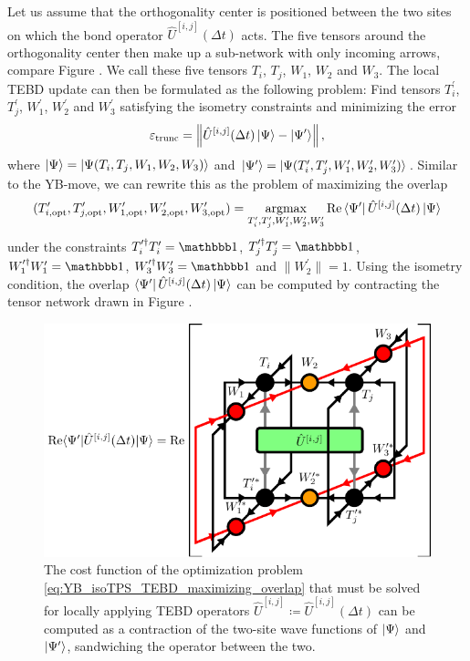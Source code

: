 Let us assume that the orthogonality center is positioned between the two sites on which the bond operator $\hat{U}^{[i, j]}\left(\Delta t\right)$ acts. The five tensors around the orthogonality center then make up a sub-network with only incoming arrows, compare Figure . We call these five tensors $T_i$, $T_j$, $W_1$, $W_2$ and $W_3$. The local TEBD update can then be formulated as the following problem: Find tensors $T_i^\prime$, $T_j^\prime$, $W_1^\prime$, $W_2^\prime$ and $W_3^\prime$ satisfying the isometry constraints and minimizing the error
\begin{equation}
	\label{eq:isoDTPS_TEBD_local_update_error}
	\varepsilon_\text{trunc} = \left\lVert \hat{U}^{[i, j]}(\Delta t)\ket{\Psi} - \ket{\Psi^\prime}\right\rVert,
\end{equation}
where $\ket{\Psi} = \ket{\Psi(T_i, T_j, W_1, W_2, W_3)}$ and $\ket{\Psi^\prime} = \ket{\Psi(T_i^\prime, T_j^\prime, W_1^\prime, W_2^\prime, W_3^\prime)}$. Similar to the YB-move, we can rewrite this as the problem of maximizing the overlap
\begin{equation}
	\label{eq:YB_isoTPS_TEBD_maximizing_overlap}
	(T_{i,\text{opt}}^\prime, T_{j,\text{opt}}^\prime, W_{1,\text{opt}}^\prime, W_{2,\text{opt}}^\prime, W_{3,\text{opt}}^\prime)= \underset{T_i^\prime, T_j^\prime, W_1^\prime, W_2^\prime, W_3^\prime}{\operatorname{argmax}}\operatorname{Re}\bra{\Psi^\prime}\hat{U}^{[i,j]}(\Delta t)\ket{\Psi}
\end{equation}
under the constraints $T_i^{\prime\dagger}T_i^\prime = \id$, $T_j^{\prime\dagger}T_j^\prime = \id$, $W_1^{\prime\dagger}W_1^\prime = \id$, $W_3^{\prime\dagger}W_3^\prime = \id$ and $\lVert W_2^\prime\rVert = 1$.
Using the isometry condition, the overlap $\bra{\Psi^\prime}\hat{U}^{[i, j]}(\Delta t)\ket{\Psi}$ can be computed by contracting the tensor network drawn in Figure . \par
\begin{figure}[ht]
	\centering
	\includegraphics[scale=1]{figures/tikz/YB_isoTPS/tebd_environment/tebd_environment.pdf}
	\caption{The cost function of the optimization problem \eqref{eq:YB_isoTPS_TEBD_maximizing_overlap} that must be solved for locally applying TEBD operators $\hat{U}^{[i,j]} \coloneqq \hat{U}^{[i,j]}(\Delta t)$ can be computed as a contraction of the two-site wave functions of $\ket{\Psi}$ and $\ket{\Psi^\prime}$, sandwiching the operator between the two.}
	\label{fig:YB_isoTPS_TEBD_overlap_contraction}
\end{figure}
